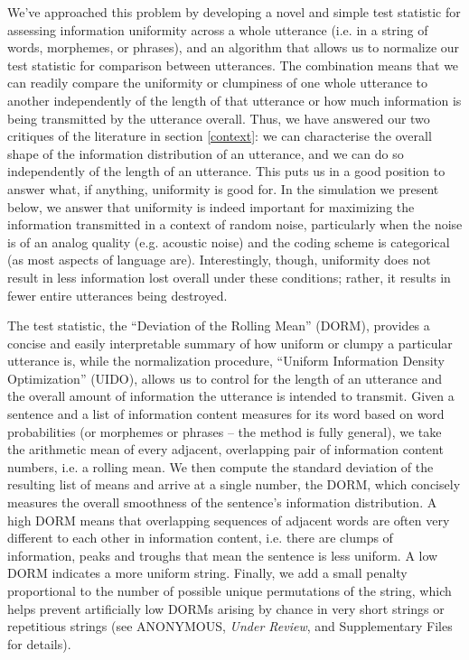 \documentclass[12pt]{article}
\begin{document}
We've approached this problem by developing a novel and simple test statistic for assessing information uniformity across a whole utterance (i.e. in a string of words, morphemes, or phrases), and an algorithm that allows us to normalize our test statistic for comparison between utterances. The combination means that we can readily compare the uniformity or clumpiness of one whole utterance to another independently of the length of that utterance or how much information is being transmitted by the utterance overall. Thus, we have answered our two critiques of the literature in section \ref{context}: we can characterise the overall shape of the information distribution of an utterance, and we can do so independently of the length of an utterance. This puts us in a good position to answer what, if anything, uniformity is good for. In the simulation we present below, we answer that uniformity is indeed important for maximizing the information transmitted in a context of random noise, particularly when the noise is of an analog quality (e.g. acoustic noise) and the coding scheme is categorical (as most aspects of language are). Interestingly, though, uniformity does not result in less information lost overall under these conditions; rather, it results in fewer entire utterances being destroyed.

The test statistic, the ``Deviation of the Rolling Mean'' (DORM), provides a concise and easily interpretable summary of how uniform or clumpy a particular utterance is, while the normalization procedure, ``Uniform Information Density Optimization'' (UIDO), allows us to control for the length of an utterance and the overall amount of information the utterance is intended to transmit. Given a sentence and a list of information content measures for its word based on word probabilities (or morphemes or phrases -- the method is fully general), we take the arithmetic mean of every adjacent, overlapping pair of information content numbers, i.e. a rolling mean. We then compute the standard deviation of the resulting list of means and arrive at a single number, the DORM, which concisely measures the overall smoothness of the sentence's information distribution. A high DORM means that overlapping sequences of adjacent words are often very different to each other in information content, i.e. there are clumps of information, peaks and troughs that mean the sentence is less uniform. A low DORM indicates a more uniform string. Finally, we add a small penalty proportional to the number of possible unique permutations of the string, which helps prevent artificially low DORMs arising by chance in very short strings or repetitious strings (see ANONYMOUS, \textsl{Under Review}, and Supplementary Files for details).
\end{document}
